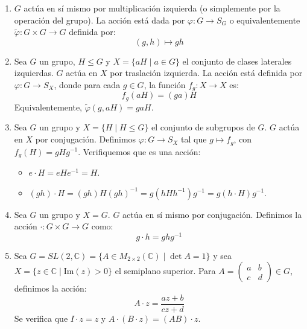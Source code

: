 \begin{eje}
\begin{enumerate}
    \item $G$ actúa en sí mismo por multiplicación izquierda (o simplemente por la operación del grupo).
    La acción está dada por $\varphi: G \to S_G$ o equivalentemente $\tilde{\varphi}: G \times G \to G$ definida por:
    \begin{equation*}
        (g, h) \mapsto gh
    \end{equation*}

    \item Sea $G$ un grupo, $H \leq G$ y $X = \{aH \mid a \in G\}$ el conjunto de clases laterales izquierdas.
    $G$ actúa en $X$ por traslación izquierda.
    La acción está definida por $\varphi: G \to S_X$, donde para cada $g \in G$, la función $f_g: X \to X$ es:
    \begin{equation*}
        f_g(aH) = (ga)H
    \end{equation*}
    Equivalentemente, $\tilde{\varphi}(g, aH) = gaH$.

    \item Sea $G$ un grupo y $X = \{H \mid H \leq G\}$ el conjunto de subgrupos de $G$.
    $G$ actúa en $X$ por conjugación.
    Definimos $\varphi: G \to S_X$ tal que $g \mapsto f_g$, con $f_g(H) = gHg^{-1}$.
    Verifiquemos que es una acción:
    \begin{itemize}
        \item $e \cdot H = eHe^{-1} = H$.
        \item $(gh) \cdot H = (gh)H(gh)^{-1} = g(hHh^{-1})g^{-1} = g(h \cdot H)g^{-1}$.
    \end{itemize}

    \item Sea $G$ un grupo y $X=G$. $G$ actúa en sí mismo por conjugación.
    Definimos la acción $\cdot : G \times G \to G$ como:
    \begin{equation*}
        g \cdot h = ghg^{-1}
    \end{equation*}

    \item Sea $G = SL(2, \mathbb{C}) = \{A \in M_{2\times2}(\mathbb{C}) \mid \det A = 1\}$ y sea $X = \{z \in \mathbb{C} \mid \text{Im}(z) > 0\}$ el semiplano superior.
    Para $A = \begin{pmatrix} a & b \\ c & d \end{pmatrix} \in G$, definimos la acción:
    \begin{equation*}
        A \cdot z = \frac{az + b}{cz + d}
    \end{equation*}
    Se verifica que $I \cdot z = z$ y $A \cdot (B \cdot z) = (AB) \cdot z$.


\end{enumerate}
\end{eje}
